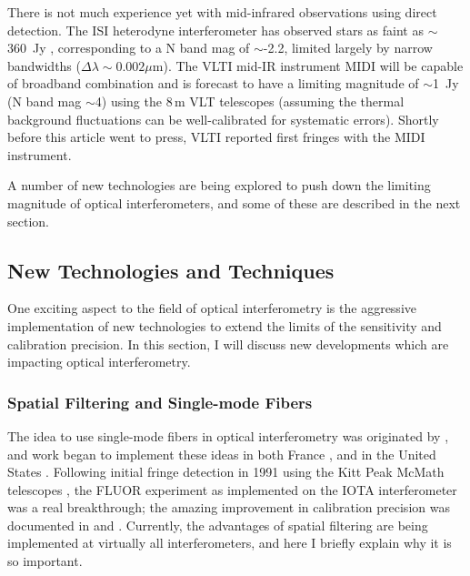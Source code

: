 \documentclass[12pt]{iopart}
\begin{document}
There is not much experience yet with mid-infrared observations using
direct detection.  The ISI heterodyne interferometer has observed
stars as faint as $\sim$360~Jy \citep[LkH$\alpha$,101][]{tuthill2002},
corresponding to a N band mag of $\sim$-2.2, limited largely by narrow
bandwidths ($\Delta\lambda\sim0.002\mu$m). The VLTI mid-IR instrument
MIDI will be capable of broadband combination and is forecast to have
a limiting magnitude of $\sim$1~Jy (N band mag $\sim$4) using the 8\,m
VLT telescopes (assuming the thermal background fluctuations can be
well-calibrated for systematic errors).  Shortly before this article
went to press, VLTI reported first fringes with the MIDI instrument.

A number of new technologies are being explored to push down the
limiting magnitude of optical interferometers, and some of these are
described in the next section.

\subsection{New Technologies and Techniques}
\label{newtechnology}

One exciting aspect to the field of optical interferometry
is the aggressive implementation
of new technologies to extend the limits of the sensitivity and 
calibration precision.  In this section, I will discuss 
new developments which are impacting optical interferometry.

\subsubsection{Spatial Filtering and Single-mode Fibers}
\label{spatialfiltering}
The idea to use single-mode fibers in optical interferometry was
originated by \citet{froehly1982}, and work began to implement these
ideas in both France \citep[e.g.,][]{connes1987,reynaud1992}, and in
the United States \citep{shaklan1987,shaklan1989}.  Following initial
fringe detection in 1991 using the Kitt Peak McMath telescopes
\citep{foresto1992}, the FLUOR experiment as implemented on the IOTA
interferometer was a real breakthrough; the amazing improvement in
calibration precision was documented in \citet{foresto1997} and
\citet{perrin1998}.  Currently, the advantages of spatial filtering
are being implemented at virtually all interferometers, and here I
briefly explain why it is so important.
\end{document}
